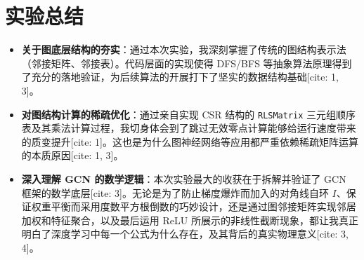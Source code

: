 \documentclass[12pt,a4paper]{article}
\begin{document}
\section{实验总结}
\begin{itemize}
    \item \textbf{关于图底层结构的夯实}：通过本次实验，我深刻掌握了传统的图结构表示法（邻接矩阵、邻接表）。代码层面的实现使得 DFS/BFS 等抽象算法原理得到了充分的落地验证，为后续算法的开展打下了坚实的数据结构基础[cite: 1, 3]。
    \item \textbf{对图结构计算的稀疏优化}：通过亲自实现 CSR 结构的 \texttt{RLSMatrix} 三元组顺序表及其乘法计算过程，我切身体会到了跳过无效零点计算能够给运行速度带来的质变提升[cite: 1]。这也是为什么图神经网络等应用都严重依赖稀疏矩阵运算的本质原因[cite: 1, 3]。
    \item \textbf{深入理解 GCN 的数学逻辑}：本次实验最大的收获在于拆解并验证了 GCN 框架的数学底层[cite: 3]。无论是为了防止梯度爆炸而加入的对角线自环 $I$、保证权重平衡而采用度数平方根倒数的巧妙设计，还是通过图邻接矩阵实现邻居加权和特征聚合，以及最后运用 ReLU 所展示的非线性截断现象，都让我真正明白了深度学习中每一个公式为什么存在，及其背后的真实物理意义[cite: 3, 4]。
\end{itemize}
\end{document}
